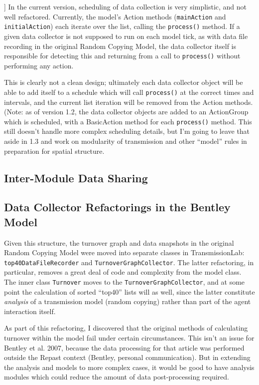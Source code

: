 \documentclass[noid]{kluwer-mem-proposal}
\begin{document}
\begin{article}
[[DEPRECATED:  Describe the new scheduling mechanism]]
In the current version, scheduling of data collection is very simplistic, and
not well refactored.  Currently, the model's Action methods (\texttt{mainAction}
and \texttt{initialAction}) each iterate over the list, calling the
\texttt{process()} method.  If a given data collector is not supposed to run on
each model tick, as with data file recording in the original Random Copying
Model, the data collector itself is responsible for detecting this and returning
from a call to \texttt{process()} without performing any action.  

This is clearly not a clean design; ultimately each data collector object will
be able to add itself to a schedule which will call \texttt{process()} at the
correct times and intervals, and the current list iteration will be removed from
the Action methods. (Note:  as of version 1.2, the data collector objects are
added to an ActionGroup which is scheduled, with a BasicAction method for each
\texttt{process()} method.  This still doesn't handle more complex scheduling
details, but I'm going to leave that aside in 1.3 and work on modularity of 
transmission and other ``model'' rules in preparation for spatial structure.  

\subsection{Inter-Module Data Sharing}


\subsection{Data Collector Refactorings in the Bentley Model}
Given this structure, the turnover graph and data snapshots in the original
Random
Copying Model were moved into separate classes in TransmissionLab:\\  \texttt{top40DataFileRecorder}
and \texttt{TurnoverGraphCollector}.  The latter refactoring, in particular,
removes a great deal of code and complexity from the model class. 
The inner class \texttt{Turnover} moves to the \texttt{TurnoverGraphCollector},
and at some point the calculation of sorted ``top40'' lists will as well, since
the latter constitute \emph{analysis} of a transmission model (random copying)
rather than part of the agent interaction itself.

As part of this refactoring, I discovered that the original methods of
calculating turnover within the model fail under certain circumstances.  This
isn't an issue for Bentley et al. 2007, because the data processing for that
article was performed outside the Repast context (Bentley, personal
communication).  But in extending the analysis and models to more complex cases,
it would be good to have analysis modules which could reduce the amount of data
post-processing required.  


\end{article}
\end{document}
